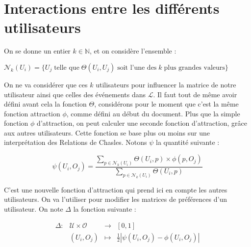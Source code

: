 \documentclass[11pt, oneside]{article}
\begin{document}
\section{Interactions entre les différents utilisateurs}

On se donne un entier $k \in \mathbb{N}$, et on considère l'ensemble :
\begin{center} $\mathcal{N} _k (U_i) = \{ U_j \; \text{telle que} \; \Theta (U_i,U_j) \; \text{soit l'une des} \; k\; \text{plus grandes valeurs} \} $ \end{center}
On ne va considérer que ces $k$ utilisateurs pour influencer la matrice de notre utilisateur ainsi que celles des événements dans $\mathcal{L}$. Il faut tout de même avoir défini avant cela la fonction $\Theta$, considérons pour le moment que c'est la même fonction attraction $\phi$, comme défini au début du document. Plus que la simple fonction $\phi$ d'attraction, on peut calculer une seconde fonction d'attraction, grâce aux autres utilisateurs. Cette fonction se base plus ou moins sur une interprétation des Relations de Chasles. Notons $\psi$ la quantité suivante :
\begin{center}
\[
\psi (U_i,O_j) = \frac{\displaystyle \sum _{p \in \mathcal{N} _k (U_i)} \Theta (U_i,p) \times \phi (p,O_j)}{\displaystyle \sum _{p \in \mathcal{N} _k (U_i)} \Theta (U_i,p)}
\]
\end{center}

C'est une nouvelle fonction d'attraction qui prend ici en compte les autres utilisateurs. On va l'utiliser pour modifier les matrices de préférences d'un utilisateur. On note $\Delta$ la fonction suivante :
\begin{center}
\[
\begin{array}{l|rcl}
\Delta : & \mathcal{U} \times \mathcal{O} & \longrightarrow & [0,1] \\
    & (U_i,O_j) & \longmapsto & \frac{1}{2} \left| \psi(U_i,O_j) - \phi(U_i,O_j)   \right| \end{array}
\]

\end{center}
\end{document}
